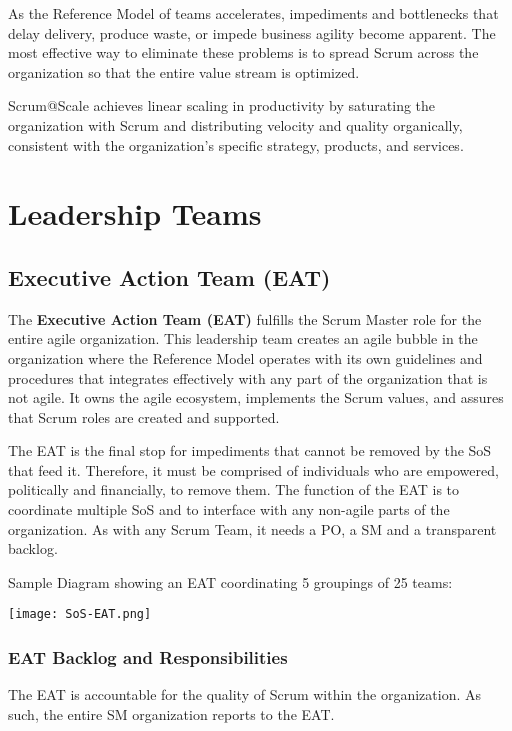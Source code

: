 \documentclass[12pt,a4paper,parskip=full]{scrartcl}
\begin{document}
As the Reference Model of teams accelerates, impediments and bottlenecks that delay delivery, produce waste, or impede business agility become apparent. The most effective way to eliminate these problems is to spread Scrum across the organization so that the entire value stream is optimized.

Scrum@Scale achieves linear scaling in productivity by saturating the organization with Scrum and distributing velocity and quality organically, consistent with the organization's specific strategy, products, and services.

\section{Leadership Teams}

\subsection{Executive Action Team (EAT)}

The \textbf{Executive Action Team (EAT)} fulfills the Scrum Master role for the entire agile organization. This leadership team creates an agile bubble in the organization where the Reference Model operates with its own guidelines and procedures that integrates effectively with any part of the organization that is not agile. It owns the agile ecosystem, implements the Scrum values, and assures that Scrum roles are created and supported.

The EAT is the final stop for impediments that cannot be removed by the SoS that feed it. Therefore, it must be comprised of individuals who are empowered, politically and financially, to remove them. The function of the EAT is to coordinate multiple SoS and to interface with any non-agile parts of the organization. As with any Scrum Team, it needs a PO, a SM and a transparent backlog.

Sample Diagram showing an EAT coordinating 5 groupings of 25 teams:

\texttt{[image: SoS-EAT.png]}

\subsubsection{EAT Backlog and Responsibilities}

The EAT is accountable for the quality of Scrum within the organization. As such, the entire SM organization reports to the EAT.
\end{document}
